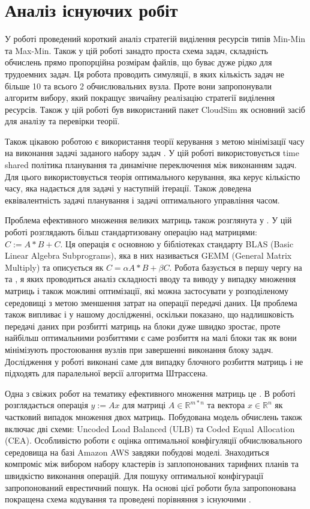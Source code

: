 \section{Аналіз існуючих робіт}

У роботі \cite{AppSelAlgoFEffResProvInCloud} проведений короткий аналіз стратегій виділення ресурсів типів Min-Min та Max-Min. Також у цій роботі занадто проста схема задач, складність обчислень прямо пропорційна розмірам файлів, що буває дуже рідко для трудоемних задач. Ця робота проводить симуляції, в яких кількість задач не більше 10 та всього 2 обчислювальних вузла. Проте вони запропонували алгоритм вибору, який покращує звичайну реалізацію стратегії виділення ресурсів. Також у цій роботі був використаний пакет CloudSim як основний засіб для аналізу та перевірки теорії.

Також цікавою роботою є використання теорії керування з метою мінімізації часу на виконання задачі заданого набору задач \cite{Prasanna1991GeneralisedMS}. У цій роботі використовується time shared політика планування та динамічне переключення між виконанням задач. Для цього використовується теорія оптимального керування, яка керує кількістю часу, яка надається для задачі у наступній ітерації. Також доведена еквівалентність задачі планування і задачі оптимального управління часом.

Проблема ефективного множення великих матриць також розглянута у \cite{PushingTheBoundsOfMatrixMatrix}. У цій роботі розглядають більш стандартизовану операцію над матрицями: $C := A*B + C$. Ця операція є основною у бібліотеках стандарту BLAS (Basic Linear Algebra Subprograms), яка в них називається GEMM (General Matrix Multiply) та описується як $C = \alpha A*B + \beta C$. Робота базується в першу чергу на \cite{IOComplexityMatrixMatrix} та \cite{Irony}, я яких проводиться аналіз складності вводу та виводу у випадку множення матриць і також можливі оптимізації, які можна застосувати у розподіленому середовищі з метою зменшення затрат на операції передачі даних. Ця проблема також випливає і у нашому дослідженні, оскільки показано, що надлишковість передачі даних при розбитті матриць на блоки дуже швидко зростає, проте найбільш оптимальними розбиттями є саме розбиття на малі блоки так як вони мінімізують простоювання вузлів при завершенні виконання блоку задач. Дослідження у роботі виконані саме для випадку блочного розбиття матриць і не підходять для паралельної версії алгоритма Штрассена.

Одна з свіжих робот на тематику ефективного множення матриць це \cite{CodedHeterogeneousMatrixMatrix}. В роботі розглядається операція $y:=Ax$ для матриці $A \in \mathbb{R}^{m*n}$ та вектора $x \in \mathbb{R}^{n}$ як частковий випадок множення двох матриць. Побудована модель обчислень також включає дві схеми: Uncoded Load Balanced (ULB) та Coded Equal Allocation (CEA). Особливістю роботи є оцінка оптимальної конфігуляції обчислювального середовища на базі Amazon AWS завдяки побудові моделі. Знаходиться компроміс між вибором набору кластерів із заплопонованих тарифних планів та швидкістю виконання операцій. Для пошуку оптимальної конфігурації запропонований еврестичний пошук. На основі цієї роботи була запропонована покращена схема кодування та проведені порівняння з існуючими \cite{CodedHeterogeneousMatrixMatrix2}.

